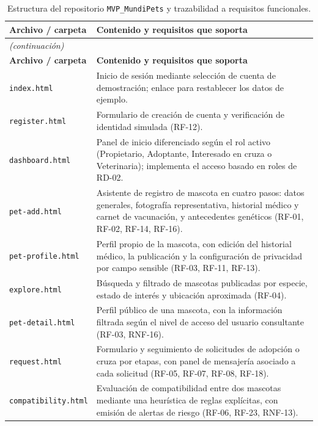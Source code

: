 \documentclass[journal,onecolumn]{IEEEtran}
\begin{document}
	\begin{longtable}{@{}p{4.2cm} p{10.6cm}@{}}
		\caption{Estructura del repositorio \texttt{MVP\_MundiPets} y trazabilidad a requisitos funcionales.}
		\label{tab:estructura-mvp} \\
		\hline
		\textbf{Archivo / carpeta} & \textbf{Contenido y requisitos que soporta} \\
		\hline
		\endfirsthead
		\multicolumn{2}{|l|}{\textit{(continuación)}} \\
		\hline
		\textbf{Archivo / carpeta} & \textbf{Contenido y requisitos que soporta} \\
		\hline
		\endhead
		\hline
		\endfoot
		\texttt{index.html} & Inicio de sesión mediante selección de cuenta de demostración; enlace para restablecer los datos de ejemplo. \\
		\hline
		\texttt{register.html} & Formulario de creación de cuenta y verificación de identidad simulada (RF-12). \\
		\hline
		\texttt{dashboard.html} & Panel de inicio diferenciado según el rol activo (Propietario, Adoptante, Interesado en cruza o Veterinaria); implementa el acceso basado en roles de RD-02. \\
		\hline
		\texttt{pet-add.html} & Asistente de registro de mascota en cuatro pasos: datos generales, fotografía representativa, historial médico y carnet de vacunación, y antecedentes genéticos (RF-01, RF-02, RF-14, RF-16). \\
		\hline
		\texttt{pet-profile.html} & Perfil propio de la mascota, con edición del historial médico, la publicación y la configuración de privacidad por campo sensible (RF-03, RF-11, RF-13). \\
		\hline
		\texttt{explore.html} & Búsqueda y filtrado de mascotas publicadas por especie, estado de interés y ubicación aproximada (RF-04). \\
		\hline
		\texttt{pet-detail.html} & Perfil público de una mascota, con la información filtrada según el nivel de acceso del usuario consultante (RF-03, RNF-16). \\
		\hline
		\texttt{request.html} & Formulario y seguimiento de solicitudes de adopción o cruza por etapas, con panel de mensajería asociado a cada solicitud (RF-05, RF-07, RF-08, RF-18). \\
		\hline
		\texttt{compatibility.html} & Evaluación de compatibilidad entre dos mascotas mediante una heurística de reglas explícitas, con emisión de alertas de riesgo (RF-06, RF-23, RNF-13). \\

\end{longtable}
\end{document}
